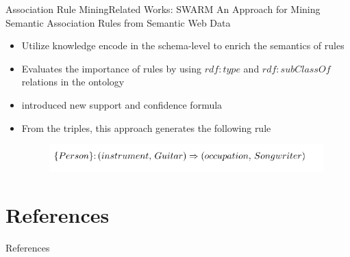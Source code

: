 \documentclass[10pt]{beamer}
\begin{document}
\begin{frame}{Association Rule Mining}{Related Works:  SWARM}
An Approach for Mining Semantic Association Rules from Semantic Web Data \cite{barati2016swarm}
\begin{itemize}
\item Utilize knowledge encode in the schema-level to enrich the semantics of rules
\item  Evaluates the importance of rules by using $rdf:type$ and $rdf:subClassOf$ relations in the ontology
\item introduced new support and confidence formula
\item From the triples, this approach generates the following rule
	\begin{figure} 
		\centering
		\includegraphics[width=1\linewidth]{images/swarm-example.PNG}
		 
	\end{figure}


	
\end{itemize}
\end{frame}
	
	



\section{References}
 \begin{frame}[allowframebreaks] {References}


 

\end{frame}

{\aauwavesbg%
\begin{frame}%
\end{frame}}
\end{document}
